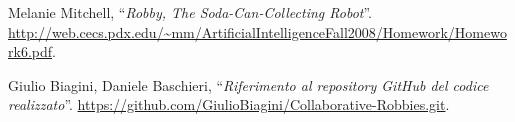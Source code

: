 \begin{thebibliography}{2}
	
	Melanie Mitchell,\newline
	``\textit{Robby, The Soda-Can-Collecting Robot}''.\newline
	\url{http://web.cecs.pdx.edu/~mm/ArtificialIntelligenceFall2008/Homework/Homework6.pdf}.
	
	Giulio Biagini, Daniele Baschieri,\newline
	``\textit{Riferimento al repository GitHub del codice realizzato}''.\newline
	\url{https://github.com/GiulioBiagini/Collaborative-Robbies.git}.
	
\end{thebibliography}
